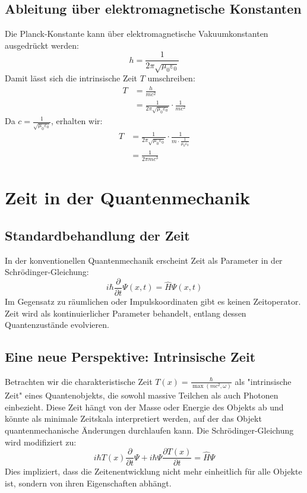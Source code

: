 \documentclass{article}
\newcommand{\Tfield}{T(x)}
\begin{document}
	\subsection{Ableitung über elektromagnetische Konstanten}
	Die Planck-Konstante kann über elektromagnetische Vakuumkonstanten ausgedrückt werden:
	\begin{equation}
		h = \frac{1}{2\pi\sqrt{\mu_0\varepsilon_0}}
	\end{equation}
	Damit lässt sich die intrinsische Zeit \( T \) umschreiben:
	\begin{align}
		T &= \frac{h}{mc^2} \\
		&= \frac{1}{2\pi\sqrt{\mu_0\varepsilon_0}} \cdot \frac{1}{mc^2}
	\end{align}
	Da \( c = \frac{1}{\sqrt{\mu_0\varepsilon_0}} \), erhalten wir:
	\begin{align}
		T &= \frac{1}{2\pi\sqrt{\mu_0\varepsilon_0}} \cdot \frac{1}{m \cdot \frac{1}{\mu_0\varepsilon_0}} \\
		&= \frac{1}{2\pi m c^3}
	\end{align}
	
	\section{Zeit in der Quantenmechanik}
	\subsection{Standardbehandlung der Zeit}
	In der konventionellen Quantenmechanik erscheint Zeit als Parameter in der Schrödinger-Gleichung:
	\begin{equation}
		i\hbar \frac{\partial}{\partial t}\Psi(x,t) = \hat{H}\Psi(x,t)
	\end{equation}
	Im Gegensatz zu räumlichen oder Impulskoordinaten gibt es keinen Zeitoperator. Zeit wird als kontinuierlicher Parameter behandelt, entlang dessen Quantenzustände evolvieren.
	
	\subsection{Eine neue Perspektive: Intrinsische Zeit}
	Betrachten wir die charakteristische Zeit \( \Tfield = \frac{\hbar}{\max(m c^2, \omega)} \) als "intrinsische Zeit" eines Quantenobjekts, die sowohl massive Teilchen als auch Photonen einbezieht. Diese Zeit hängt von der Masse oder Energie des Objekts ab und könnte als minimale Zeitskala interpretiert werden, auf der das Objekt quantenmechanische Änderungen durchlaufen kann. Die Schrödinger-Gleichung wird modifiziert zu:
	\begin{equation}
		i\hbar \Tfield \frac{\partial}{\partial t} \Psi + i\hbar \Psi \frac{\partial \Tfield}{\partial t} = \hat{H} \Psi
	\end{equation}
	Dies impliziert, dass die Zeitenentwicklung nicht mehr einheitlich für alle Objekte ist, sondern von ihren Eigenschaften abhängt.
	
\end{document}
